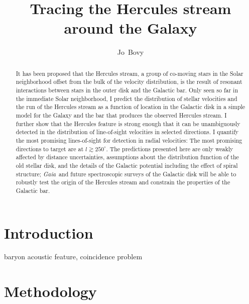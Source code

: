 \documentclass[12pt,preprint]{aastex}
\newcommand{\Gaia}{\emph{Gaia}}
\begin{document}
\title{Tracing the Hercules stream around the Galaxy}
\author{Jo~Bovy}%

\begin{abstract}
It has been proposed that the Hercules stream, a group of co-moving
stars in the Solar neighborhood offset from the bulk of the velocity
distribution, is the result of resonant interactions between stars in
the outer disk and the Galactic bar. Only seen so far in the immediate
Solar neighborhood, I predict the distribution of stellar velocities
and the run of the Hercules stream as a function of location in the
Galactic disk in a simple model for the Galaxy and the bar that
produces the observed Hercules stream. I further show that the
Hercules feature is strong enough that it can be unambiguously
detected in the distribution of line-of-sight velocities in selected
directions. I quantify the most promising lines-of-sight for detection
in radial velocities: The most promising directions to target are at
$l \gtrsim 250^{\circ}$. The predictions presented here are only
weakly affected by distance uncertainties, assumptions about the
distribution function of the old stellar disk, and the details of the
Galactic potential including the effect of spiral structure;
\Gaia\ and future spectroscopic surveys of the Galactic disk will be
able to robustly test the origin of the Hercules stream and constrain
the properties of the Galactic bar.
\end{abstract}


\section{Introduction}


baryon acoustic feature, coincidence problem

\section{Methodology}\label{sec:method}
\end{document}
